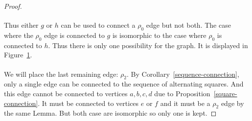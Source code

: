 \begin{proof}
\paragraph{}
Thus either $g$ or $h$ can be used to connect a $\rho_0$ edge but not both. The case where the $\rho_0$ edge is connected to $g$ is isomorphic to the case where $\rho_0$ is connected to $h$. Thus there is only one possibility for the graph. It is displayed in Figure~\ref{proof-5-4}.

\begin{figure}[H]
  \begin{center}
    \caption{}
    \label{proof-5-4}
  \end{center}
\end{figure}

\paragraph{}
We will place the last remaining edge: $\rho_2$. By Corollary~\ref{sequence-connection}, only a single edge can be connected to the sequence of alternating squares. And this edge cannot be connected to vertices $a,b,c,d$ due to Proposition~\ref{square-connection}. It must be connected to vertices $e$ or $f$ and it must be a $\rho_2$ edge by the same Lemma. But both case are isomorphic so only one is kept.


\end{proof}
